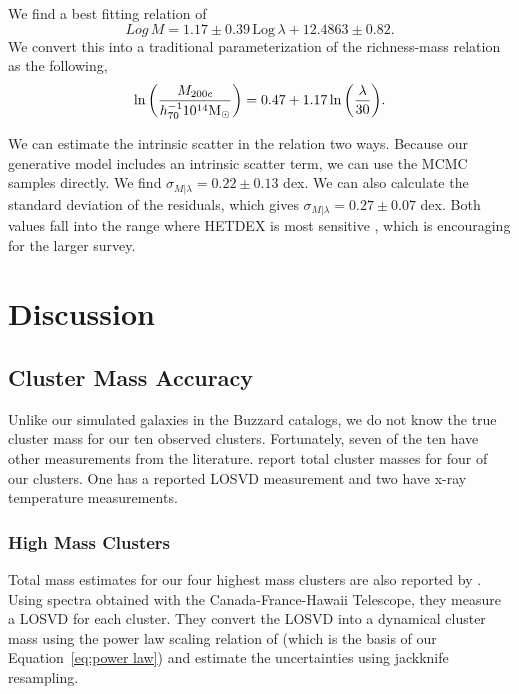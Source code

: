 We find a best fitting relation of
\begin{equation}
 Log\,M=1.17\pm{0.39}\, \mathrm{Log}\,\lambda + 12.4863\pm{0.82}. 
\end{equation}
We convert this into a traditional parameterization of the richness-mass relation  as the following, 
\begin{equation}\label{eq: best fit}
	\ln\bigg{(}\frac{M_{200c}}{h_{70}^{-1} 10^{14}\hbox{$\mathrm{M}_\odot$}}\bigg{)} = 0.47 + 1.17 \ln\bigg{(}\frac{\lambda}{30}\bigg{)}.
\end{equation}

We can estimate the intrinsic scatter in the relation two ways. Because our generative model includes an intrinsic scatter term, we can use the MCMC samples directly. We find $\sigma_{M|\lambda} = 0.22\pm0.13$ dex. We can also calculate the standard deviation of the residuals, which gives  $\sigma_{M|\lambda} = 0.27\pm0.07$ dex. Both values fall into the range where HETDEX is most sensitive , which is encouraging for the larger survey.

\section{Discussion}\label{sec:discussion}
\subsection{Cluster Mass Accuracy}
Unlike our simulated galaxies in the Buzzard catalogs, we do not know the true cluster mass for our ten observed clusters. Fortunately, seven of the ten have other measurements from the literature. \cite{Sifon2015} report total cluster masses for four of our clusters. One has a reported LOSVD measurement and two have x-ray temperature measurements.

\subsubsection{High Mass Clusters}
Total mass estimates for our four highest mass clusters are also reported by \cite{Sifon2015}. Using spectra obtained with the Canada-France-Hawaii Telescope, they measure a LOSVD for each cluster. They convert the LOSVD into a dynamical cluster mass using the power law scaling relation of \cite{Evrard2008} (which is the basis of our Equation~\ref{eq:power law}) and estimate the uncertainties using jackknife resampling. 

